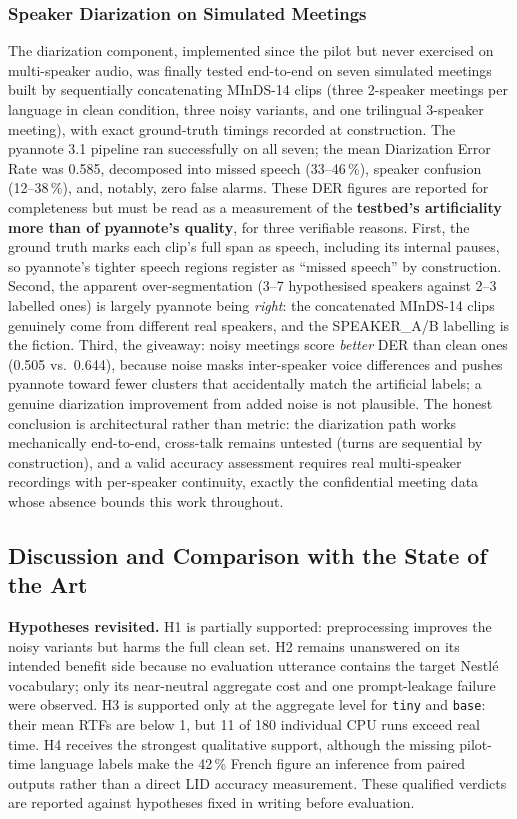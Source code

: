 \documentclass[12pt]{report}
\begin{document}
\subsubsection{Speaker Diarization on Simulated Meetings}
The diarization component, implemented since the pilot but never exercised on multi-speaker audio, was finally tested end-to-end on seven simulated meetings built by sequentially concatenating MInDS-14 clips (three 2-speaker meetings per language in clean condition, three noisy variants, and one trilingual 3-speaker meeting), with exact ground-truth timings recorded at construction. The pyannote 3.1 pipeline ran successfully on all seven; the mean Diarization Error Rate was 0.585, decomposed into missed speech (33--46\,\%), speaker confusion (12--38\,\%), and, notably, zero false alarms.
These DER figures are reported for completeness but must be read as a measurement of the \textbf{testbed's artificiality more than of pyannote's quality}, for three verifiable reasons. First, the ground truth marks each clip's full span as speech, including its internal pauses, so pyannote's tighter speech regions register as \enquote{missed speech} by construction. Second, the apparent over-segmentation (3--7 hypothesised speakers against 2--3 labelled ones) is largely pyannote being \emph{right}: the concatenated MInDS-14 clips genuinely come from different real speakers, and the SPEAKER\_A/B labelling is the fiction. Third, the giveaway: noisy meetings score \emph{better} DER than clean ones (0.505 vs.\ 0.644), because noise masks inter-speaker voice differences and pushes pyannote toward fewer clusters that accidentally match the artificial labels; a genuine diarization improvement from added noise is not plausible. The honest conclusion is architectural rather than metric: the diarization path works mechanically end-to-end, cross-talk remains untested (turns are sequential by construction), and a valid accuracy assessment requires real multi-speaker recordings with per-speaker continuity, exactly the confidential meeting data whose absence bounds this work throughout.
\subsection{Discussion and Comparison with the State of the Art}
\textbf{Hypotheses revisited.} H1 is partially supported: preprocessing improves the noisy variants but harms the full clean set. H2 remains unanswered on its intended benefit side because no evaluation utterance contains the target Nestl\'e vocabulary; only its near-neutral aggregate cost and one prompt-leakage failure were observed. H3 is supported only at the aggregate level for \texttt{tiny} and \texttt{base}: their mean RTFs are below 1, but 11 of 180 individual CPU runs exceed real time. H4 receives the strongest qualitative support, although the missing pilot-time language labels make the 42\,\% French figure an inference from paired outputs rather than a direct LID accuracy measurement. These qualified verdicts are reported against hypotheses fixed in writing before evaluation.
\end{document}
